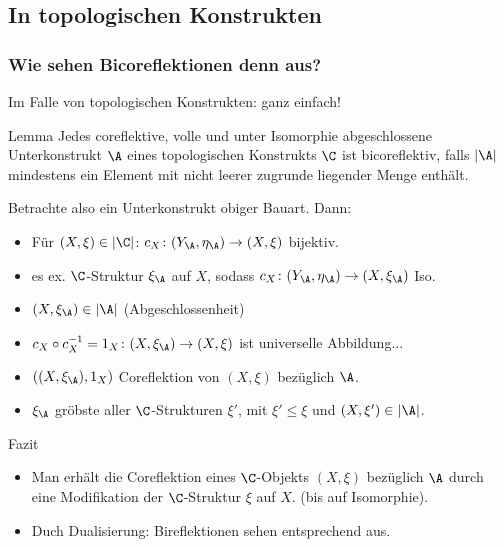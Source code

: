 \subsection{In topologischen Konstrukten}

\begin{frame}
\frametitle{Wie sehen Bicoreflektionen denn aus?}

Im Falle von topologischen Konstrukten: ganz einfach!

  \pause

  \begin{block}{Lemma}
  Jedes coreflektive, volle und unter Isomorphie abgeschlossene Unterkonstrukt $\A$ eines topologischen Konstrukts $\C$ ist bicoreflektiv, falls $|\A|$ mindestens ein Element mit nicht leerer zugrunde liegender Menge enthält.
  \end{block}

  \pause
  Betrachte also ein Unterkonstrukt obiger Bauart. Dann:

  \begin{itemize}
    \item<+-> Für $(X, \xi) \in |\C|$: $c_X \colon (Y_\A, \eta_\A) \to (X, \xi)$ bijektiv.
    \item<+-> es ex. $\C$-Struktur $\xi_\A$ auf $X$, sodass $c_X \colon (Y_\A, \eta_\A) \to (X, \xi_\A)$ Iso.

    \item<+-> $(X, \xi_\A) \in |\A|$ (Abgeschlossenheit)

    \item<+->  $c_X \circ c_X^{-1} = 1_X \colon (X,\xi_\A) \to (X,\xi)$ ist universelle Abbildung...

    \item<+-> $((X,\xi_\A),1_X)$ Coreflektion von $(X,\xi)$ bez\"uglich $\A$.\qedhere

    \item<+-> $\xi_\A$ gröbste aller $\C$-Strukturen $\xi'$, mit $\xi' \leq \xi$ und $(X, \xi') \in |\A|$.
  \end{itemize}

  \pause

  \begin{block}{Fazit}
    \begin{itemize}
      \item<+-> Man erhält die Coreflektion eines  $\C$-Objekts $(X,\xi)$ bezüglich $\A$ durch eine Modifikation der $\C$-Struktur $\xi$ auf $X$. (bis auf Isomorphie).
      \item<+-> Duch Dualisierung: Bireflektionen sehen entsprechend aus.
    \end{itemize}
  \end{block}

\end{frame}

